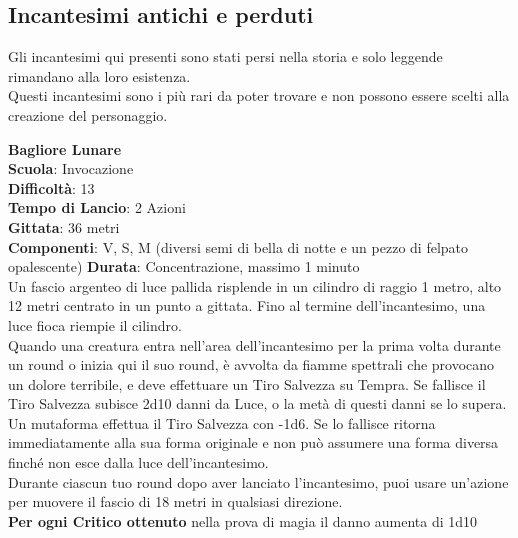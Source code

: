\pagebreak

\subsection{Incantesimi antichi e perduti}

Gli incantesimi qui presenti sono stati persi nella storia e solo leggende rimandano alla loro esistenza.\\
Questi incantesimi sono i più rari da poter trovare e non possono essere scelti alla creazione del personaggio.

\begin{multicols}{2}


\medskip\textbf{Bagliore Lunare}\\
\textbf{Scuola}: Invocazione\\
\textbf{Difficoltà}: 13\\
\textbf{Tempo di Lancio}: 2 Azioni\\
\textbf{Gittata}: 36 metri\\
\textbf{Componenti}: V, S, M (diversi semi di bella di notte e un pezzo di felpato opalescente)
\textbf{Durata}: Concentrazione, massimo 1 minuto\\
Un fascio argenteo di luce pallida risplende in un cilindro di raggio 1 metro, alto 12 metri centrato in un punto a gittata. Fino al termine dell'incantesimo, una luce fioca riempie il cilindro. \\
Quando una creatura entra nell'area dell'incantesimo per la prima volta durante un round o inizia qui il suo round, è avvolta da fiamme spettrali che provocano un dolore terribile, e deve effettuare un Tiro Salvezza su Tempra. Se fallisce il Tiro Salvezza subisce 2d10 danni da Luce, o la metà di questi danni se lo supera. Un mutaforma effettua il Tiro Salvezza con -1d6. Se lo fallisce ritorna immediatamente alla sua forma originale e non può assumere una forma diversa finché non esce dalla luce dell'incantesimo.\\
Durante ciascun tuo round dopo aver lanciato l'incantesimo, puoi usare un'azione per muovere il
fascio di 18 metri in qualsiasi direzione. \\
\textbf{Per ogni Critico ottenuto} nella prova di magia il danno aumenta di 1d10


\end{multicols}
